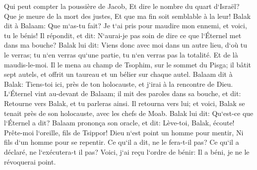 \verse Qui peut compter la poussière de Jacob, Et dire le nombre du quart d`Israël? Que je meure de la mort des justes, Et que ma fin soit semblable à la leur! 
\verse Balak dit à Balaam: Que m`as-tu fait? Je t`ai pris pour maudire mon ennemi, et voici, tu le bénis! 
\verse Il répondit, et dit: N`aurai-je pas soin de dire ce que l`Éternel met dans ma bouche? 
\verse Balak lui dit: Viens donc avec moi dans un autre lieu, d`où tu le verras; tu n`en verras qu`une partie, tu n`en verras pas la totalité. Et de là maudis-le-moi. 
\verse Il le mena au champ de Tsophim, sur le sommet du Pisga; il bâtit sept autels, et offrit un taureau et un bélier sur chaque autel. 
\verse Balaam dit à Balak: Tiens-toi ici, près de ton holocauste, et j`irai à la rencontre de Dieu. 
\verse L`Éternel vint au-devant de Balaam; il mit des paroles dans sa bouche, et dit: Retourne vers Balak, et tu parleras ainsi. 
\verse Il retourna vers lui; et voici, Balak se tenait près de son holocauste, avec les chefs de Moab. Balak lui dit: Qu`est-ce que l`Éternel a dit? 
\verse Balaam prononça son oracle, et dit: Lève-toi, Balak, écoute! Prête-moi l`oreille, fils de Tsippor! 
\verse Dieu n`est point un homme pour mentir, Ni fils d`un homme pour se repentir. Ce qu`il a dit, ne le fera-t-il pas? Ce qu`il a déclaré, ne l`exécutera-t il pas? 
\verse Voici, j`ai reçu l`ordre de bénir: Il a béni, je ne le révoquerai point. 
